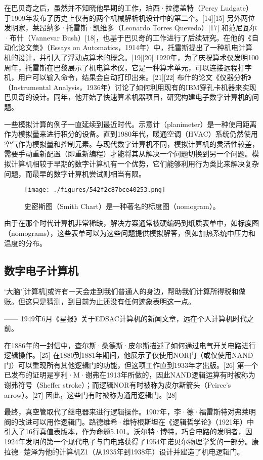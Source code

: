在巴贝奇之后，虽然并不知晓他早期的工作，珀西·拉德盖特（Percy Ludgate）于1909年发布了历史上仅有的两个机械解析机设计中的第二个。[14][15] 另外两位发明家，莱昂纳多·托雷斯·凯维多（Leonardo Torres Quevedo）[17] 和范尼瓦尔·布什（Vannevar Bush）[18]，也基于巴贝奇的工作进行了后续研究。在他的《自动化论文集》（Essays on Automatics，1914年）中，托雷斯提出了一种机电计算机的设计，并引入了浮动点算术的概念。[19][20] 1920年，为了庆祝算术仪发明100周年，托雷斯在巴黎展示了机电算术仪，它是一种算术单元，可以连接远程打字机，用户可以输入命令，结果会自动打印出来。[21][22] 布什的论文《仪器分析》（Instrumental Analysis，1936年）讨论了如何利用现有的IBM穿孔卡机器来实现巴贝奇的设计。同年，他开始了快速算术机器项目，研究构建电子数字计算机的问题。

一些模拟计算的例子一直延续到最近时代。示意计（planimeter）是一种使用距离作为模拟量来进行积分的设备。直到1980年代，暖通空调（HVAC）系统仍然使用空气作为模拟量和控制元素。与现代数字计算机不同，模拟计算机的灵活性较差，需要手动重新配置（即重新编程）才能将其从解决一个问题切换到另一个问题。模拟计算机相较于早期的数字计算机有一个优势，它们能够利用行为类比来解决复杂问题，而最早的数字计算机尝试则相当有限。
\begin{figure}[ht]
\centering
\texttt{[image: ./figures/542f2c87bce40253.png]}
\caption{史密斯图（Smith Chart）是一种著名的标度图（nomogram）。} \label{fig_JSJS_1}
\end{figure}
由于在那个时代计算机非常稀缺，解决方案通常被硬编码到纸质表单中，如标度图（nomograms），这些表单可以为这些问题提供模拟解答，例如加热系统中压力和温度的分布。
\subsection{数字电子计算机}   
‘大脑’[计算机]或许有一天会走到我们普通人的身边，帮助我们计算所得税和做账。但这只是猜测，到目前为止还没有任何迹象表明这一点。

—— 1949年6月《星报》关于EDSAC计算机的新闻文章，远在个人计算机时代之前。
 
在1886年的一封信中，查尔斯·桑德斯·皮尔斯描述了如何通过电气开关电路进行逻辑操作。[25] 在1880到1881年期间，他展示了仅使用NOR门（或仅使用NAND门）可以重现所有其他逻辑门的功能，但这项工作直到1933年才出版。[26] 第一个已发布的证明是亨利·M·谢弗在1913年所做的，因此NAND逻辑运算有时被称为谢弗符号（Sheffer stroke）；而逻辑NOR有时被称为皮尔斯箭头（Peirce's arrow）。[27] 因此，这些门有时被称为通用逻辑门。[28]  

最终，真空管取代了继电器来进行逻辑操作。1907年，李·德·福雷斯特对弗莱明阀的改进可以用作逻辑门。路德维希·维特根斯坦在《逻辑哲学论》（1921年）中引入了16行真值表版本，作为命题5.101。沃尔特·博特，巧合电路的发明者，因1924年发明的第一个现代电子与门电路获得了1954年诺贝尔物理学奖的一部分。康拉德·楚泽为他的计算机Z1（从1935年到1938年）设计并建造了机电逻辑门。  

